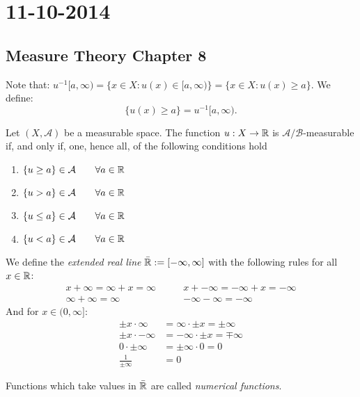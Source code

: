 \section{11-10-2014}
\subsection{Measure Theory Chapter 8}
\begin{defn}
Note that:
\(u^{-1}[a,\infty )=\{x\in X:u(x)\in [a,\infty )\}=\{x\in X:u(x)\geq a\}.\)
We define:
\[
\{u(x)\geq a\}=u^{-1}[a,\infty ).
\]
\end{defn}

\begin{thm}
Let \((X,\mathcal{A})\) be a measurable space. The function \(u:X\rightarrow \Bbb{R}\) is \(\mathcal{A}/\mathcal{B}\)-measurable if, and only if, one, hence all, of the following conditions hold

\begin{enumerate}
  \item \(\{u\geq a\}\in \mathcal{A} \qquad \forall a\in \Bbb{R}\)
  \item \(\{u>a\}\in \mathcal{A} \qquad \forall a\in \Bbb{R}\)
  \item \(\{u\leq a\}\in \mathcal{A} \qquad \forall a\in \Bbb{R}\)
  \item \(\{u<a\}\in \mathcal{A} \qquad \forall a\in \Bbb{R}\)
\end{enumerate}
\end{thm}


\begin{defn}
We define the \emph{extended real line \(\bar{\Bbb{R}}:=[-\infty ,\infty ]\)} with the following rules for all \(x\in \Bbb{R}\):
\begin{align*}
x+\infty =\infty +x=\infty  \qquad &x+-\infty =-\infty +x=-\infty  \\
\infty +\infty =\infty  \qquad &-\infty -\infty =-\infty 
\end{align*}
And for \(x\in (0,\infty ]:\)
\begin{align*}
\pm x\cdot \infty &=\infty \cdot \pm x=\pm \infty  \\
\pm x\cdot -\infty &=-\infty \cdot \pm x=\mp \infty  \\
0\cdot \pm \infty &=\pm \infty \cdot 0=0 \\
\frac{1}{\pm \infty }&=0
\end{align*}
\end{defn}

\begin{defn}
Functions which take values in \(\bar{\Bbb{R}}\) are called \emph{numerical functions}.
\end{defn}

